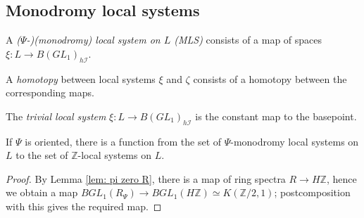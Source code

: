 \documentclass{TPmod}
\def\bZ{\mathbb{Z}}
\newcommand{\cI}{\mathcal{I}}
\def\bZ{\mathbb{Z}}
\numberwithin{equation}{section}
\begin{document}
\subsection{Monodromy local systems}

    \begin{defn}
        A \emph{($\Psi$-)(monodromy) local system on $L$ (MLS)} consists of a map of spaces $\xi: L \to B(GL_1)_{h\cI}$.

        A \emph{homotopy} between local systems $\xi$ and $\zeta$ consists of a homotopy between the corresponding maps.
    \end{defn}
    \begin{ex}
        The \emph{trivial local system} $\xi: L \to B(GL_1)_{h\cI}$ is the constant map to the basepoint.
    \end{ex}
   

    \begin{lem} \label{lem:MLS to classical local system} 
        If $\Psi$ is oriented, there is a function from the set of $\Psi$-monodromy local systems on $L$ to the set of $\bZ$-local systems on $L$.
    \end{lem}

    \begin{proof}
        By Lemma \ref{lem: pi zero R}, there is a map of ring spectra $R \to H\bZ$, hence we obtain a map $BGL_1(R_\Psi) \to BGL_1(H\bZ) \simeq K(\bZ/2, 1)$; postcomposition with this gives the required map.
    \end{proof}
\end{document}
